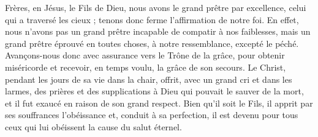 Frères,
en Jésus, le Fils de Dieu,
nous avons le grand prêtre par excellence,
celui qui a traversé les cieux ;
tenons donc ferme l’affirmation de notre foi.
En effet, nous n’avons pas un grand prêtre
incapable de compatir à nos faiblesses,
mais un grand prêtre éprouvé en toutes choses,
à notre ressemblance, excepté le péché.
Avançons-nous donc avec assurance
vers le Trône de la grâce,
pour obtenir miséricorde
et recevoir, en temps voulu, la grâce de son secours.
\versseparator
Le Christ,
pendant les jours de sa vie dans la chair,
offrit, avec un grand cri et dans les larmes,
des prières et des supplications
à Dieu qui pouvait le sauver de la mort,
et il fut exaucé
en raison de son grand respect.
Bien qu’il soit le Fils,
il apprit par ses souffrances l’obéissance
et, conduit à sa perfection,
il est devenu pour tous ceux qui lui obéissent
la cause du salut éternel.